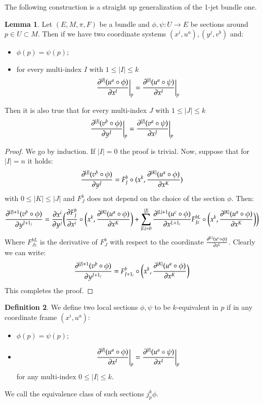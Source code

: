 \documentclass[12pt,a4paper]{report}
\theoremstyle{definition}
\newtheorem{Def}{Definition}[chapter]
\theoremstyle{Theorem}
\newtheorem{Lm}[Def]{Lemma}
\theoremstyle{break}
\theoremstyle{definition}
\begin{document}
	The following construction is a straight up generalization of the 1-jet bundle one.
	\begin{Lm}
		Let $(E,M,\pi,F)$ be a bundle and $\phi,\psi:U\rightarrow E$ be sections around $p\in U\subset M$. Then if we have two coordinate systems $(x^i,u^a),(y^j,v^b)$ and:
		\begin{itemize}
			\item $\phi(p)=\psi(p)$;
			\item for every multi-index $I$ with $1\leq |I|\leq k$
			$${\partial^{|I|} (u^a\circ \phi)\over \partial x^I}\bigg|_p={\partial^{|I|} (u^a\circ \psi)\over \partial x^I}\bigg|_p$$
		\end{itemize}
		Then it is also true that for every multi-index $J$ with $1\leq |J|\leq k$
		$${\partial^{|J|} (v^b\circ \phi)\over \partial y^J}\bigg|_p={\partial^{|J|} (v^a\circ \psi)\over \partial x^J}\bigg|_p$$
	\end{Lm}
	\begin{proof}
		We go by induction. If $|I|=0$ the proof is trivial. Now, suppose that for $|I|=n$ it holds:
		$${\partial^{|J|}(v^b\circ \phi)\over \partial y^J }=F^b_J\circ(x^k,{\partial^{|K|} (u^a\circ \phi)\over \partial x^K})$$
		with $0\leq |K|\leq |J|$ and $F^b_J$ does not depend on the choice of the section $\phi$. Then:
		$${\partial^{|J|+1}(v^b\circ \phi)\over \partial y^{J+1_j} }={\partial x^i\over \partial y^j}\bigg({\partial F^b_J\over \partial x^i}\circ\bigg(x^k,{\partial^{|K|} (u^a\circ \phi)\over \partial x^K}\bigg)+\sum_{|L|=0}^{|J|}{\partial^{|L|+1}(u^c\circ \phi)\over \partial x^{L+1_i}} F^{bL}_{Jc}\circ\bigg(x^k,{\partial^{|K|} (u^a\circ \phi)\over \partial x^K}\bigg)\bigg)$$
		Where $F^{bL}_{Jc}$ is the derivative of $F^b_J$ with respect to the coordinate ${\partial^{|L|}(u^c\circ \phi)\over \partial x^{L}}$. Clearly we can write:
		$${\partial^{|J|+1}(v^b\circ \phi)\over \partial y^{J+1_j} }=F^b_{J+1_i}\circ \bigg(x^k,{\partial^{|K|} (u^a\circ \phi)\over \partial x^K}\bigg)$$
		This completes the proof.
	\end{proof}
	\begin{Def}
		We define two local sections $\phi,\psi$ to be $k$-equivalent in $p$ if in any coordinate frame $(x^i,u^a)$:
		\begin{itemize}
			\item $\phi(p)=\psi(p)$;
			\item $${\partial^{|I|} (u^a\circ \phi)\over \partial x^I}\bigg|_p={\partial^{|I|} (u^a\circ \psi)\over \partial x^I}\bigg|_p$$
			for any multi-index $0\leq |I|\leq k$.
		\end{itemize}
		We call the equivalence class of such sections $j^k_p\phi.$
	\end{Def}
\end{document}
